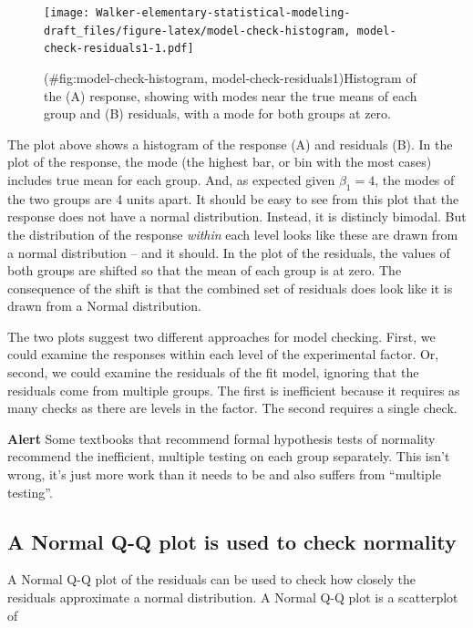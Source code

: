 \documentclass[]{book}
\begin{document}
\begin{figure}
\centering
\texttt{[image: Walker-elementary-statistical-modeling-draft\_files/figure-latex/model-check-histogram, model-check-residuals1-1.pdf]}
\caption{(\#fig:model-check-histogram, model-check-residuals1)Histogram of the (A) response, showing with modes near the true means of each group and (B) residuals, with a mode for both groups at zero.}
\end{figure}

The plot above shows a histogram of the response (A) and residuals (B). In the plot of the response, the mode (the highest bar, or bin with the most cases) includes true mean for each group. And, as expected given \(\beta_1=4\), the modes of the two groups are 4 units apart. It should be easy to see from this plot that the response does not have a normal distribution. Instead, it is distincly bimodal. But the distribution of the response \emph{within} each level looks like these are drawn from a normal distribution -- and it should. In the plot of the residuals, the values of both groups are shifted so that the mean of each group is at zero. The consequence of the shift is that the combined set of residuals does look like it is drawn from a Normal distribution.

The two plots suggest two different approaches for model checking. First, we could examine the responses within each level of the experimental factor. Or, second, we could examine the residuals of the fit model, ignoring that the residuals come from multiple groups. The first is inefficient because it requires as many checks as there are levels in the factor. The second requires a single check.

\textbf{Alert} Some textbooks that recommend formal hypothesis tests of normality recommend the inefficient, multiple testing on each group separately. This isn't wrong, it's just more work than it needs to be and also suffers from ``multiple testing''.

\hypertarget{a-normal-q-q-plot-is-used-to-check-normality}{%
\subsection{A Normal Q-Q plot is used to check normality}\label{a-normal-q-q-plot-is-used-to-check-normality}}

A Normal Q-Q plot of the residuals can be used to check how closely the residuals approximate a normal distribution. A Normal Q-Q plot is a scatterplot of
\end{document}
